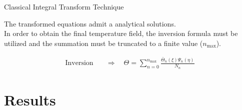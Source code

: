 \documentclass[english,landscape,xcolor=dvipsnames,aspectratio=169]{beamer}
\newcommand{\nmax}{n_{\max}}
\begin{document}
		 
		 
		 
\begin{frame}{Classical Integral Transform Technique}
			
The transformed equations admit a analytical solutions. \\[1em]
	
In order to obtain the final temperature field, the inversion formula must be utilized and the summation must be truncated to a finite value ($\nmax$).
		
\begin{align*}
\text{Inversion} \quad & \Rightarrow \quad \Theta= \sum_{n=0}^{\nmax} \frac{ \bar{\Theta}_n(\xi)\Psi_n(\eta)}{N_n} 
\end{align*}		
\end{frame}




		








\section{Results}
\end{document}
